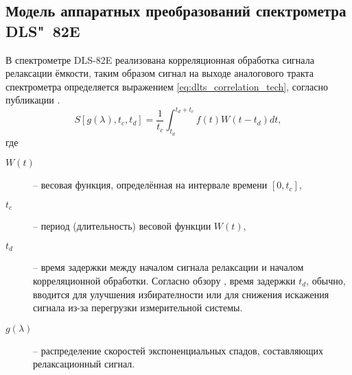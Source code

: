     \subsection{Модель аппаратных преобразований спектрометра DLS"~82E}

    В спектрометре DLS-82E реализована корреляционная обработка сигнала
    релаксации ёмкости, таким образом сигнал на выходе аналогового тракта
    спектрометра определяется выражением \ref{eq:dlts_correlation_tech},
    согласно публикации \cite{istratov_exp_analysis}.
    \begin{equation}
        \label{eq:dlts_correlation_tech}
        S\left[g(\lambda),t_c,t_d\right]=\frac{1}{t_c}\int_{t_d}^{t_d+t_c}
        f(t)W\left(t-t_d\right)dt ,
    \end{equation}
    где
    \begin{description}
        \item[$W(t)$] -- весовая функция, определённая на интервале 
        времени $\left[0,t_c\right]$,
        \item[$t_c$] -- период (длительность) весовой функции $W(t)$,
        \item[$t_d$] -- время задержки между началом сигнала релаксации
        и началом корреляционной обработки. Согласно обзору 
        \cite{istratov_exp_analysis}, время задержки $t_d$, обычно, 
        вводится для улучшения избирателности или для снижения искажения
        сигнала из-за перегрузки измерительной системы.
        \item[$g(\lambda)$] -- распределение скоростей экспоненциальных
        спадов, составляющих релаксационный сигнал.
    \end{description}

